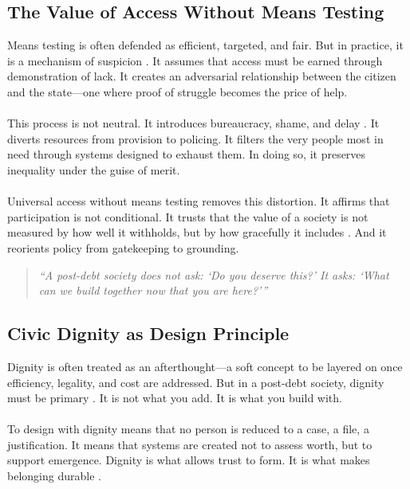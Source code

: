 \documentclass[12pt]{article}
\begin{document}
\subsection{The Value of Access Without Means Testing}

Means testing is often defended as efficient, targeted, and fair. But in practice, it is a mechanism of suspicion \cite{goffman2014ontherun}. It assumes that access must be earned through demonstration of lack. It creates an adversarial relationship between the citizen and the state—one where proof of struggle becomes the price of help.

\paragraph{}This process is not neutral. It introduces bureaucracy, shame, and delay \cite{spade2015normal}. It diverts resources from provision to policing. It filters the very people most in need through systems designed to exhaust them. In doing so, it preserves inequality under the guise of merit.

\paragraph{}Universal access without means testing removes this distortion. It affirms that participation is not conditional. It trusts that the value of a society is not measured by how well it withholds, but by how gracefully it includes \cite{cohen2009principled}. And it reorients policy from gatekeeping to grounding.

\begin{quote}
    \emph{“A post-debt society does not ask: ‘Do you deserve this?’  
    It asks: ‘What can we build together now that you are here?’”}
\end{quote}

\subsection{Civic Dignity as Design Principle}

Dignity is often treated as an afterthought—a soft concept to be layered on once efficiency, legality, and cost are addressed. But in a post-debt society, dignity must be primary \cite{levinas1969totality}. It is not what you add. It is what you build with.

\paragraph{}To design with dignity means that no person is reduced to a case, a file, a justification. It means that systems are created not to assess worth, but to support emergence. Dignity is what allows trust to form. It is what makes belonging durable \cite{hooks1994teaching}.
\end{document}
